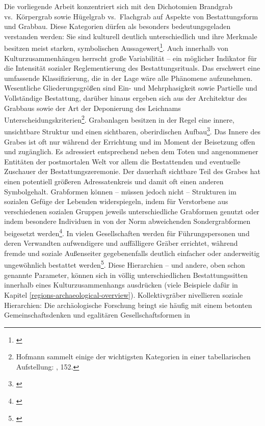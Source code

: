 \documentclass[openany,twoside,twocolumn]{book}
\let\rmarkdownfootnote\footnote%
\def\footnote{\protect\rmarkdownfootnote}
\begin{document}
Die vorliegende Arbeit konzentriert sich mit den Dichotomien Brandgrab
vs.~Körpergrab sowie Hügelgrab vs.~Flachgrab auf Aspekte von
Bestattungsform und Grabbau. Diese Kategorien dürfen als besonders
bedeutungsgeladen verstanden werden: Sie sind kulturell deutlich
unterschiedlich und ihre Merkmale besitzen meist starken, symbolischen
Aussagewert\footnote{\textcite{kaliff_grave_1998}}. Auch innerhalb von
Kulturzusammenhängen herrscht große Variabilität -- ein möglicher
Indikator für die Intensität sozialer Reglementierung des
Bestattungsrituals. Das erschwert eine umfassende Klassifizierung, die
in der Lage wäre alle Phänomene aufzunehmen. Wesentliche
Gliederungsgrößen sind Ein- und Mehrphasigkeit sowie Partielle und
Vollständige Bestattung, darüber hinaus ergeben sich aus der Architektur
des Grabbaus sowie der Art der Deponierung des Leichnams
Unterscheidungskriterien\footnote{Hofmann sammelt einige der wichtigsten
  Kategorien in einer tabellarischen Aufstellung:
  \textcite{hofmann_rituelle_2008}, 152.}. Grabanlagen besitzen in der
Regel eine innere, unsichtbare Struktur und einen sichtbaren,
oberirdischen Aufbau\footnote{\textcite{skjoldebrand_variations_1995}}.
Das Innere des Grabes ist oft nur während der Errichtung und im Moment
der Beisetzung offen und zugänglich. Es adressiert entsprechend neben
dem Toten und angenommener Entitäten der postmortalen Welt vor allem die
Bestattenden und eventuelle Zuschauer der Bestattungszeremonie. Der
dauerhaft sichtbare Teil des Grabes hat einen potentiell größeren
Adressatenkreis und damit oft einen anderen Symbolgehalt. Grabformen
können -- müssen jedoch nicht -- Strukturen im sozialen Gefüge der
Lebenden widerspiegeln, indem für Verstorbene aus verschiedenen sozialen
Gruppen jeweils unterschiedliche Grabformen genutzt oder indem besondere
Individuen in von der Norm abweichenden Sondergrabformen beigesetzt
werden\footnote{\textcite{hodder_social_1980}}. In vielen Gesellschaften
werden für Führungspersonen und deren Verwandten aufwendigere und
auffälligere Gräber errichtet, während fremde und soziale Außenseiter
gegebenenfalls deutlich einfacher oder anderweitig ungewöhnlich
bestattet werden\footnote{\textcite{pauli_ungewohnliche_1978}}. Diese
Hierarchien -- und andere, oben schon genannte Parameter, können sich in
völlig unterschiedlichen Bestattungssitten innerhalb eines
Kulturzusammenhangs ausdrücken (viele Beispiele dafür in Kapitel
\ref{regions-archaeological-overview}). Kollektivgräber nivellieren
soziale Hierarchien: Die archäologische Forschung bringt sie häufig mit
einem betonten Gemeinschaftsdenken und egalitären Gesellschaftsformen in
\end{document}
